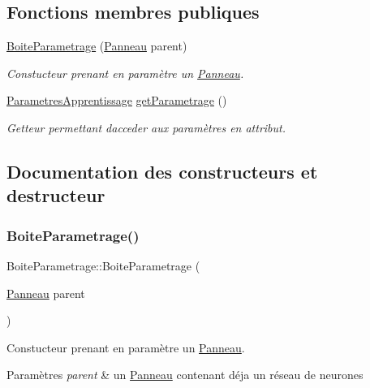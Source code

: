 \subsection*{Fonctions membres publiques}
\begin{DoxyCompactItemize}
\item 
\hyperlink{classBoiteParametrage_a5c4d9098fac45ee4dc7ff2d6d8e910bb}{Boite\+Parametrage} (\hyperlink{classPanneau}{Panneau} parent)
\begin{DoxyCompactList}\small\item\em Constucteur prenant en paramètre un \hyperlink{classPanneau}{Panneau}. \end{DoxyCompactList}\item 
\hyperlink{classParametresApprentissage}{Parametres\+Apprentissage} \hyperlink{classBoiteParametrage_ad7c3de61949e05469a73e6b8369205e2}{get\+Parametrage} ()
\begin{DoxyCompactList}\small\item\em Getteur permettant d\textquotesingle{}acceder aux paramètres en attribut. \end{DoxyCompactList}\end{DoxyCompactItemize}


\subsection{Documentation des constructeurs et destructeur}
\mbox{\label{classBoiteParametrage_a5c4d9098fac45ee4dc7ff2d6d8e910bb}} 
\subsubsection{\texorpdfstring{Boite\+Parametrage()}{BoiteParametrage()}}
{\footnotesize\ttfamily Boite\+Parametrage\+::\+Boite\+Parametrage (\begin{DoxyParamCaption}\item[{\hyperlink{classPanneau}{Panneau}}]{parent }\end{DoxyParamCaption})}



Constucteur prenant en paramètre un \hyperlink{classPanneau}{Panneau}. 


\begin{DoxyParams}{Paramètres}
{\em parent} & un \hyperlink{classPanneau}{Panneau} contenant déja un réseau de neurones \\
\hline
\end{DoxyParams}


